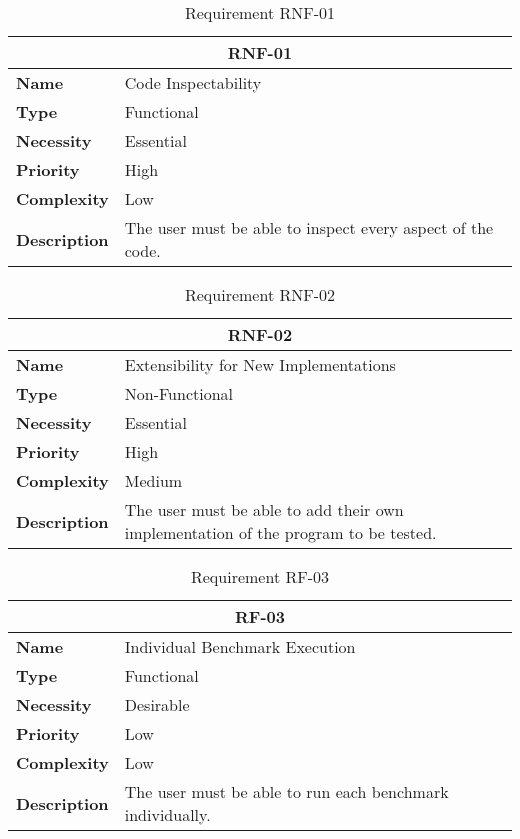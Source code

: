 \begin{table}[H]
    \centering
    \begin{tabular}{l p{10cm}}
        \toprule
        \multicolumn{2}{c}{\textbf{RNF-01}} \\
        \toprule
        \textbf{Name}               & Code Inspectability \\
        \textbf{Type}               & Functional \\
        \textbf{Necessity}          & Essential \\
        \textbf{Priority}           & High \\
        \textbf{Complexity}         & Low \\
        \textbf{Description}        & The user must be able to inspect every aspect of the code. \\
        \bottomrule
    \end{tabular}
\caption{Requirement RNF-01}\label{tab:rnf-01}
\end{table}

\begin{table}[H]
    \centering
    \begin{tabular}{l p{10cm}}
        \toprule
        \multicolumn{2}{c}{\textbf{RNF-02}} \\
        \toprule
        \textbf{Name}               & Extensibility for New Implementations \\
        \textbf{Type}               & Non-Functional \\
        \textbf{Necessity}          & Essential \\
        \textbf{Priority}           & High \\
        \textbf{Complexity}         & Medium \\
        \textbf{Description}        & The user must be able to add their own implementation of the program to be tested. \\
        \bottomrule
    \end{tabular}
\caption{Requirement RNF-02}\label{tab:rnf-02}
\end{table}

\begin{table}[H]
    \centering
    \begin{tabular}{l p{10cm}}
        \toprule
        \multicolumn{2}{c}{\textbf{RF-03}} \\
        \toprule
        \textbf{Name}               & Individual Benchmark Execution \\
        \textbf{Type}               & Functional \\
        \textbf{Necessity}          & Desirable \\
        \textbf{Priority}           & Low \\
        \textbf{Complexity}         & Low \\
        \textbf{Description}        & The user must be able to run each benchmark individually. \\
        \bottomrule
    \end{tabular}
\caption{Requirement RF-03}\label{tab:rf-03}
\end{table}


